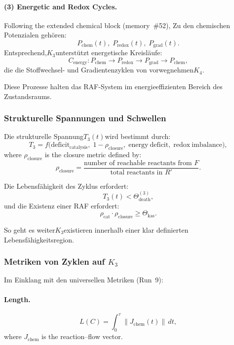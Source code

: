 \paragraph{(3) Energetic and Redox Cycles.}

Following the extended chemical block (memory~\#52),
Zu den chemischen Potenzialen gehören:
\[
  P_{\mathrm{chem}}(t),\;
  P_{\mathrm{redox}}(t),\;
  P_{\mathrm{grad}}(t).
\]
Entsprechend,$K_3$unterstützt energetische Kreisläufe:
\[
  C_{\mathrm{energy}}: 
  P_{\mathrm{chem}}\to P_{\mathrm{redox}}
    \to P_{\mathrm{grad}} \to P_{\mathrm{chem}},
\]
die die Stoffwechsel- und Gradientenzyklen von vorwegnehmen$K_4$.

Diese Prozesse halten das RAF-System im energieeffizienten Bereich
des Zustandsraums.

\subsubsection{Strukturelle Spannungen und Schwellen}

Die strukturelle Spannung$T_3(t)$wird bestimmt durch:
\[
T_3 =
   f\bigl(
     \mathrm{deficit}_{\mathrm{catalysis}},\;
     1-\rho_{\mathrm{closure}},\;
     \mathrm{energy\ deficit},\;
     \mathrm{redox\ imbalance}
   \bigr),
\]
where $\rho_{\mathrm{closure}}$ is the closure metric defined by:
\[
  \rho_{\mathrm{closure}} =
    \frac{\text{number of reachable reactants from } F}
         {\text{total reactants in } R'}.
\]

Die Lebensfähigkeit des Zyklus erfordert:
\[
  T_3(t) < \Theta_{\mathrm{death}}^{(3)},
\]
und die Existenz einer RAF erfordert:
\[
  \rho_{\mathrm{cat}} \cdot \rho_{\mathrm{closure}}
  \ge \Theta_{\mathrm{kas}}.
\]

So geht es weiter$K_3$existieren innerhalb einer klar definierten Lebensfähigkeitsregion.

\subsubsection{Metriken von Zyklen auf \texorpdfstring{$K_3$}{K_3}}

Im Einklang mit den universellen Metriken (Run~9):

\paragraph{Length.}
\[
  L(C) = \int_0^\tau \|J_{\mathrm{chem}}(t)\|\, dt,
\]
where $J_{\mathrm{chem}}$ is the reaction–flow vector.

